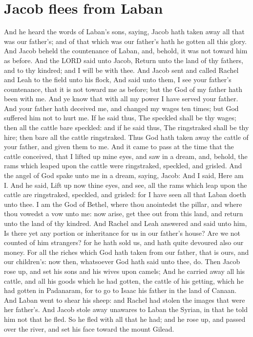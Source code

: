 \section*{Jacob flees from Laban}
\begin{biblechapter} %
\verse And he heard the words of Laban's sons, saying, Jacob hath taken away all that was our father's; and of that which was our father's hath he gotten all this glory.
\verse And Jacob beheld the countenance of Laban, and, behold, it was not toward him as before.
\verse And the LORD said unto Jacob, Return unto the land of thy fathers, and to thy kindred; and I will be with thee.
\verse And Jacob sent and called Rachel and Leah to the field unto his flock,
\verse And said unto them, I see your father's countenance, that it is not toward me as before; but the God of my father hath been with me.
\verse And ye know that with all my power I have served your father.
\verse And your father hath deceived me, and changed my wages ten times; but God suffered him not to hurt me.
\verse If he said thus, The speckled shall be thy wages; then all the cattle bare speckled: and if he said thus, The ringstraked shall be thy hire; then bare all the cattle ringstraked.
\verse Thus God hath taken away the cattle of your father, and given them to me.
\verse And it came to pass at the time that the cattle conceived, that I lifted up mine eyes, and saw in a dream, and, behold, the rams which leaped upon the cattle were ringstraked, speckled, and grisled.
\verse And the angel of God spake unto me in a dream, saying, Jacob: And I said, Here am I.
\verse And he said, Lift up now thine eyes, and see, all the rams which leap upon the cattle are ringstraked, speckled, and grisled: for I have seen all that Laban doeth unto thee.
\verse I am the God of Bethel, where thou anointedst the pillar, and where thou vowedst a vow unto me: now arise, get thee out from this land, and return unto the land of thy kindred.
\verse And Rachel and Leah answered and said unto him, Is there yet any portion or inheritance for us in our father's house?
\verse Are we not counted of him strangers? for he hath sold us, and hath quite devoured also our money.
\verse For all the riches which God hath taken from our father, that is ours, and our children's: now then, whatsoever God hath said unto thee, do.
\verse Then Jacob rose up, and set his sons and his wives upon camels;
\verse And he carried away all his cattle, and all his goods which he had gotten, the cattle of his getting, which he had gotten in Padanaram, for to go to Isaac his father in the land of Canaan.
\verse And Laban went to shear his sheep: and Rachel had stolen the images that were her father's.
\verse And Jacob stole away unawares to Laban the Syrian, in that he told him not that he fled.
\verse So he fled with all that he had; and he rose up, and passed over the river, and set his face toward the mount Gilead.

\end{biblechapter}
